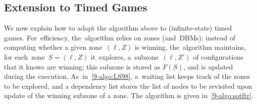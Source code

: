 \subsection*{Extension to Timed Games}

We now explain how to adapt the algorithm above to (infinite-state)
timed games. 
%
For~efficiency, the~algorithm relies on zones (and~DBMs); instead of
computing whether a given zone~$(\ell,Z)$ is winning, the~algorithm
maintains, for each~zone~$S=(\ell,Z)$ it~explores, a~subzone~$(\ell,Z')$ of
configurations that it knows are winning; this subzone is stored as
$F(S)$, and is updated during the execution.
As~in~\cref{9-algo:LS98}, a~waiting list keeps track of the
zones to be explored, and a dependency list stores the list of nodes
to be revisited upon update of the winning subzone of a zone.
The algorithm is given in~\cref{9-algo:sotftr}.



